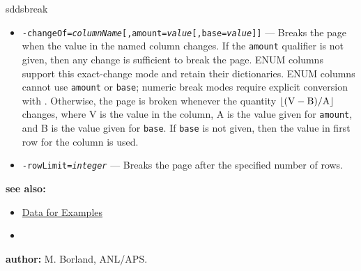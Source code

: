 \begin{sddsprog}{sddsbreak}
\begin{itemize}
      \item {\tt -changeOf=\emph{columnName}[,amount=\emph{value}[,base=\emph{value}]]} --- Breaks the page when the value in the named column changes. If the {\tt amount} qualifier is not given, then any change is sufficient to break the page. ENUM columns support this exact-change mode and retain their dictionaries. ENUM columns cannot use {\tt amount} or {\tt base}; numeric break modes require explicit conversion with . Otherwise, the page is broken whenever the quantity ${\rm \lfloor (V - B)/A \rfloor}$ changes, where V is the value in the column, A is the value given for {\tt amount}, and B is the value given for {\tt base}. If {\tt base} is not given, then the value in first row for the column is used.
      \item {\tt -rowLimit=\emph{integer}} --- Breaks the page after the specified number of rows.
    \end{itemize}
  \item \textbf{see also:}
    \begin{itemize}
      \item \hyperref[exampleData]{Data for Examples}
      \item {}
    \end{itemize}
  \item \textbf{author:} M. Borland, ANL/APS.
\end{sddsprog}
